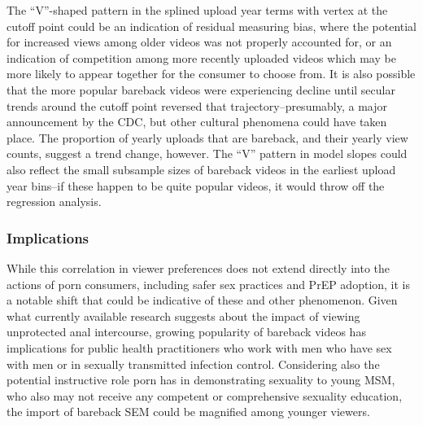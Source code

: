 \documentclass[]{article}
\begin{document}
The ``V''-shaped pattern in the splined upload year terms with vertex at
the cutoff point could be an indication of residual measuring bias,
where the potential for increased views among older videos was not
properly accounted for, or an indication of competition among more
recently uploaded videos which may be more likely to appear together for
the consumer to choose from. It is also possible that the more popular
bareback videos were experiencing decline until secular trends around
the cutoff point reversed that trajectory--presumably, a major
announcement by the CDC, but other cultural phenomena could have taken
place. The proportion of yearly uploads that are bareback, and their
yearly view counts, suggest a trend change, however. The ``V'' pattern
in model slopes could also reflect the small subsample sizes of bareback
videos in the earliest upload year bins--if these happen to be quite
popular videos, it would throw off the regression analysis.

\subsubsection{Implications}\label{implications}

While this correlation in viewer preferences does not extend directly
into the actions of porn consumers, including safer sex practices and
PrEP adoption, it is a notable shift that could be indicative of these
and other phenomenon. Given what currently available research suggests
about the impact of viewing unprotected anal intercourse, growing
popularity of bareback videos has implications for public health
practitioners who work with men who have sex with men or in sexually
transmitted infection control. Considering also the potential
instructive role porn has in demonstrating sexuality to young MSM, who
also may not receive any competent or comprehensive sexuality education,
the import of bareback SEM could be magnified among younger viewers.
\end{document}

